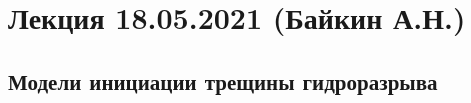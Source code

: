 \documentclass[main.tex]{subfiles}
\begin{document}

\section{Лекция 18.05.2021 (Байкин А.Н.)}

\subsection{Модели инициации трещины гидроразрыва}
\end{document}

